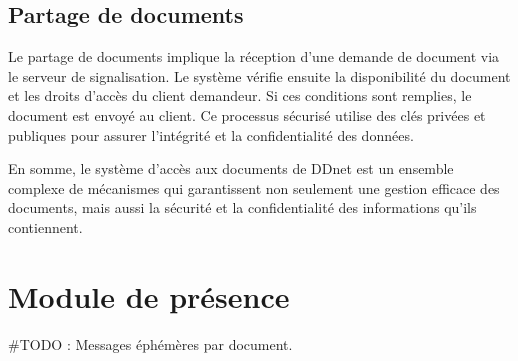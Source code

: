 \subsection{Partage de documents}

Le partage de documents implique la réception d'une demande de document via le serveur de signalisation. Le système vérifie ensuite la disponibilité du document et les droits d'accès du client demandeur. Si ces conditions sont remplies, le document est envoyé au client. Ce processus sécurisé utilise des clés privées et publiques pour assurer l'intégrité et la confidentialité des données.

En somme, le système d'accès aux documents de DDnet est un ensemble complexe de mécanismes qui garantissent non seulement une gestion efficace des documents, mais aussi la sécurité et la confidentialité des informations qu'ils contiennent.







\section{Module de présence}
#TODO : Messages éphémères par document.
